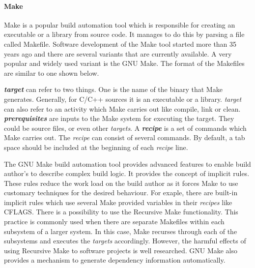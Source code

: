\documentclass[12pt, a4paper, titlepage]{scrartcl}
\newcommand\tab[1][1cm]{\hspace*{#1}}
\begin{document}
\paragraph{Make}
\par Make is a popular build automation tool which is responsible for creating an executable or a library from source code. It manages to do this by parsing a file called Makefile. Software development of the Make tool started more than 35 years ago\cite{Feldman1979} and there are several variants that are currently available. A very popular and widely used variant is the GNU Make. The format of the Makefiles are similar to one shown below\cite{GNUMakeManual}. 

\noindent\fbox{%
	\parbox{\textwidth}{%
	target : prerequisites \\
		\tab recipe
	}%
}

\par \textit{\textbf{target}} can refer to two things. One is the name of the binary that Make generates. Generally, for C/C++ sources it is an executable or a library. \textit{target} can also refer to an activity which Make carries out like compile, link or clean. \textit{\textbf{prerequisites}} are inputs to the Make system for executing the target. They could be source files, or even other \textit{targets}. A \textit{\textbf{recipe}} is a set of commands which Make carries out. The \textit{recipe} can consist of several commands. By default, a tab space should be included at the beginning of each \textit{recipe} line.
\par The GNU Make build automation tool provides advanced features to enable build author's to describe complex build logic. It provides the concept of implicit rules\cite{GNUMakeManual}. These rules reduce the work load on the build author as it forces Make to use customary techniques for the desired behaviour. For exaple, there are built-in implicit rules which use several Make provided variables in their \textit{recipes} like CFLAGS. There is a possibility to use the Recursive Make\cite{RecursiveMake} functionality. This practice is commonly used when there are separate Makefiles within each subsystem of a larger system. In this case, Make recurses through each of the subsystems and executes the \textit{targets} accordingly. However, the harmful effects of using Recursive Make to software projects is well researched\cite{miller1998recursive}. GNU Make also provides a mechanism to generate dependency information automatically\cite{AutoDepGen}. 
\end{document}
